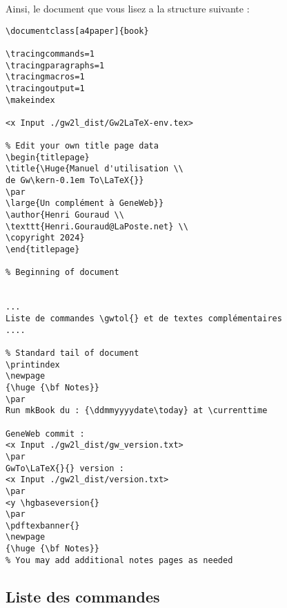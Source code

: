 Ainsi, le document que vous lisez a la structure suivante :

\begin{verbatim}
\documentclass[a4paper]{book}

\tracingcommands=1
\tracingparagraphs=1 
\tracingmacros=1
\tracingoutput=1
\makeindex

<x Input ./gw2l_dist/Gw2LaTeX-env.tex>

% Edit your own title page data
\begin{titlepage}
\title{\Huge{Manuel d'utilisation \\
de Gw\kern-0.1em To\LaTeX{}}
\par
\large{Un complément à GeneWeb}}
\author{Henri Gouraud \\
\texttt{Henri.Gouraud@LaPoste.net} \\
\copyright 2024}
\end{titlepage}

% Beginning of document


...
Liste de commandes \gwtol{} et de textes complémentaires
....

% Standard tail of document
\printindex
\newpage
{\huge {\bf Notes}}
\par
Run mkBook du : {\ddmmyyyydate\today} at \currenttime

GeneWeb commit :
<x Input ./gw2l_dist/gw_version.txt>
\par
GwTo\LaTeX{}{} version :
<x Input ./gw2l_dist/version.txt>
\par
<y \hgbaseversion{}
\par
\pdftexbanner{}
\newpage
{\huge {\bf Notes}}
% You may add additional notes pages as needed

\end{verbatim}

\subsection{Liste des commandes \gwtol{}}


